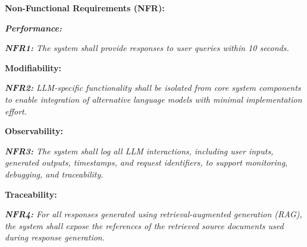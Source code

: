 \textbf{Non-Functional Requirements (NFR):}
\begin{adjustwidth}{\indentWidthTwenty}{\indentWidthTwenty}
    \textit{\textbf{Performance:}}
\end{adjustwidth}
\begin{adjustwidth}{\indentWidthForty}{\indentWidthForty}
    \textit{\textbf{NFR1:} The system shall provide responses to user queries within 10 seconds.}
\end{adjustwidth}

\begin{adjustwidth}{\indentWidthTwenty}{\indentWidthTwenty}
    \textbf{Modifiability:}
\end{adjustwidth}
\begin{adjustwidth}{\indentWidthForty}{\indentWidthForty}
    \textit{\textbf{NFR2:} LLM-specific functionality shall be isolated from core system components to enable integration of alternative language models with minimal implementation effort.}
\end{adjustwidth}

\begin{adjustwidth}{\indentWidthTwenty}{\indentWidthTwenty}
    \textbf{Observability:}
\end{adjustwidth}
\begin{adjustwidth}{\indentWidthForty}{\indentWidthForty}
    \textit{\textbf{NFR3:} The system shall log all LLM interactions, including user inputs, generated outputs, timestamps, and request identifiers, to support monitoring, debugging, and traceability.}
\end{adjustwidth}

\begin{adjustwidth}{\indentWidthTwenty}{\indentWidthTwenty}
    \textbf{Traceability:}
\end{adjustwidth}
\begin{adjustwidth}{\indentWidthForty}{\indentWidthForty}
    \textit{\textbf{NFR4:} For all responses generated using retrieval-augmented generation (RAG), the system shall expose the references of the retrieved source documents used during response generation.}
\end{adjustwidth}

